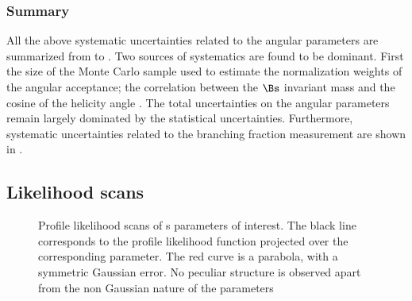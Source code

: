 \subsubsection{Summary}
\label{systSummary}
All the above systematic uncertainties related to the angular parameters are summarized from 
to . Two sources of systematics are found to be dominant. First the size of the Monte
Carlo sample used to estimate the normalization weights of the angular acceptance; the correlation between the $\Bs$ invariant
mass and the cosine of the helicity angle \thetamu. The total uncertainties on the angular parameters remain largely dominated
by the statistical uncertainties. Furthermore, systematic uncertainties related to the branching fraction measurement
are shown in .

\subsection{Likelihood scans}
\label{nllscans}

\begin{figure}[h]
  \centering
  \begin{subfigure}{0.5\textwidth}
    \scalebox{0.60}{}
    \caption{}
    \label{nll_ACP0}
  \end{subfigure}%
  \hfill%
  \begin{subfigure}{0.5\textwidth}
    \scalebox{0.60}{}
    \caption{}
    \label{nll_ACPperp}
  \end{subfigure}
  \begin{subfigure}{0.5\textwidth}
    \scalebox{0.60}{}
    \caption{}
    \label{nll_ACPpar}
  \end{subfigure}%
  \hfill%
  \begin{subfigure}{0.5\textwidth}
    \scalebox{0.60}{}
    \caption{}
    \label{nll_ACPS}
  \end{subfigure}
\caption{Profile likelihood scans of \Acp{} parameters of interest. The black line corresponds to the profile likelihood
         function projected over the corresponding parameter. The red curve is a parabola, with a symmetric Gaussian 
         error. No peculiar structure is observed apart from the non Gaussian nature of the parameters}
\end{figure}

